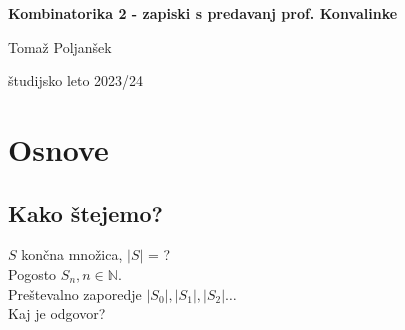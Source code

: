 \documentclass[a4paper, 12pt]{book}
\title{\ttitle}
\author{\tauthor}
\date{\tdate}
\newcommand{\ttitle}{Kombinatorika 2 - zapiski s predavanj prof. Konvalinke}
\newcommand{\tauthor}{Tomaž Poljanšek}
\newcommand{\tdate}{študijsko leto 2023/24}
\theoremstyle{definition}
\theoremstyle{remark}
\newcommand{\N}{\mathbb{N}}
\newcommand\mymaketitle{
  \begin{titlepage}
    \begin{center}
        \vspace*{4cm}
        \Huge
        \textbf{\ttitle}
                        
        \vspace{1.5cm}
        \huge
        \tauthor
            
        \vspace{3cm}
        \Large
        \tdate
    \end{center}
  \end{titlepage}
}
\begin{document}
\renewcommand{\thepage}{}
\newcommand{\sn}[1]{"`#1"'}

\mymaketitle

\clearpage

\frontmatter

\pagestyle{empty}
\def\thepage{}
\tableofcontents{}

\def\x{\hspace{3ex}}    %
\def\y{\hspace{2.45ex}}  %
\def\z{\hspace{1.9ex}}    %
\stackMath







\mainmatter
\setcounter{page}{1}
\pagestyle{fancy}





\chapter{Osnove}


\section{Kako štejemo?}

$S$ končna množica, $|S|$ = ? \\
Pogosto $S_n, n \in \N$. \\
Preštevalno zaporedje $|S_0|, |S_1|, |S_2| \dots$ \\
Kaj je odgovor?
\end{document}
